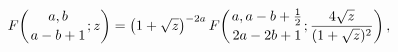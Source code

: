 \[\mathop{F\/}\nolimits\!\left({a,b\atop a-b+1};z\right)=\left(1+\sqrt{z}\right)%
^{-2a}\mathop{F\/}\nolimits\!\left({a,a-b+\tfrac{1}{2}\atop 2a-2b+1};\frac{4%
\sqrt{z}}{(1+\sqrt{z})^{2}}\right),\]